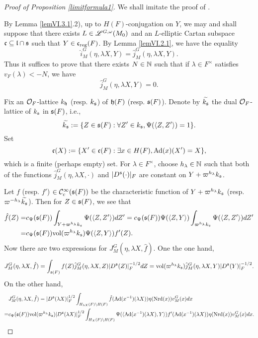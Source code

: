 \documentclass[a4paper]{amsart}
\newcommand{\vol}{{\mathrm{vol}}}                   \newcommand{\Vol}{{\mathrm{Vol}}}
\newcommand{\wt}{\widetilde}                        \newcommand{\wh}{\widehat}                      \newcommand{\wpair}[1]{\left\{{#1}\right\}}
\theoremstyle{definition}
\theoremstyle{remark}
\numberwithin{equation}{subsection}
\begin{document}
\begin{proof}[Proof of Proposition \ref{limitformula1}]
We shall imitate the proof of \cite[Proposition 2.2]{MR2164623}. 

By Lemma \ref{lemVI.3.1}.2), up to $H(F)$-conjugation on $Y$, we may and shall suppose that there exists $L\in\mathscr{L}^{G, \omega}(M_0)$ and an $L$-elliptic Cartan subspace ${\mathfrak{c}}\subseteq{\mathfrak{l}}\cap{\mathfrak{s}}$ such that $Y\in{\mathfrak{c}}_{\mathrm{reg}}(F)$. By Lemma \ref{lemVI.2.1}, we have the equality
$$ \hat{i}_M^G(\eta, \lambda X, Y)=\hat{j}_M^G(\eta, \lambda X, Y). $$
Thus it suffices to prove that there exists $N\in{\mathbb {N}}$ such that if $\lambda\in F^\times$ satisfies $v_F(\lambda)<-N$, we have
$$ \hat{j}_M^G(\eta, \lambda X, Y)=0. $$

Fix an ${\mathcal {O}}_F$-lattice $k_{\mathfrak{h}}$ (resp. $k_{\mathfrak{s}}$) of ${\mathfrak{h}}(F)$ (resp. ${\mathfrak{s}}(F)$). Denote by $\wt{k_\fs}$ the dual ${\mathcal {O}}_F$-lattice of $k_{\mathfrak{s}}$ in ${\mathfrak{s}}(F)$, i.e., 
$$ \wt{k_\fs}:=\{Z\in\fs(F): \forall Z'\in k_\fs, \Psi(\langle Z,Z'\rangle)=1\}. $$
Set
$$ {\mathfrak{c}}(X):=\{X'\in{\mathfrak{c}}(F): \exists x\in H(F), {\mathrm{Ad}}(x)(X')=X\}, $$
which is a finite (perhaps empty) set. For $\lambda\in F^\times$, choose $h_\lambda\in{\mathbb {N}}$ such that both of the functions $\hat{j}_M^G(\eta, \lambda X, \cdot)$ and $|D^{\mathfrak{s}}(\cdot)|_F$ are constant on $Y+\varpi^{h_\lambda} k_{\mathfrak{s}}$. 

Let $f$ (resp. $f'$) $\in{\mathcal {C}}_c^\infty({\mathfrak{s}}(F))$ be the characteristic function of $Y+\varpi^{h_\lambda}k_{\mathfrak{s}}$ (resp. $\varpi^{-h_\lambda}\wt{k_\fs}$). Then for $Z\in{\mathfrak{s}}(F)$, we see that
\[\begin{split}
\hat{f}(Z)=&c_\Psi(\fs(F))\int_{Y+\varpi^{h_\lambda}k_\fs} \Psi(\langle Z,Z' \rangle)dZ'=c_\Psi(\fs(F))\Psi(\langle Z,Y \rangle)\int_{\varpi^{h_\lambda}k_\fs} \Psi(\langle Z,Z' \rangle)dZ' \\
=&c_\Psi(\fs(F)) \vol(\varpi^{h_\lambda}k_\fs) \Psi(\langle Z,Y \rangle) f'(Z). 
\end{split}\]
Now there are two expressions for $J_M^G(\eta, \lambda X, \hat{f})$. One the one hand, 
\begin{equation}\label{prop2.2(2.5)exp1}
 J_M^G(\eta, \lambda X, \hat{f})=\int_{\fs(F)} f(Z) \hat{j}_M^G(\eta, \lambda X, Z) |D^\fs(Z)|_F^{-1/2} dZ=\vol(\varpi^{h_\lambda}k_\fs) \hat{j}_M^G(\eta, \lambda X, Y) |D^\fs(Y)|_F^{-1/2}. 
\end{equation}
On the other hand, 
\begin{equation}\label{prop2.2(2.6)exp2}
\begin{split}
 &J_M^G(\eta, \lambda X, \hat{f})=|D^\fs(\lambda X)|_F^{1/2} \int_{H_{\lambda X}(F)\bs H(F)} \hat{f}(\Ad(x^{-1})(\lambda X)) \eta(\Nrd(x)) v_M^G(x) dx \\
=&c_\Psi(\fs(F)) \vol(\varpi^{h_\lambda}k_\fs) |D^\fs(\lambda X)|_F^{1/2} \int_{H_X(F)\bs H(F)} \Psi(\langle \Ad(x^{-1})(\lambda X),Y \rangle) f'(\Ad(x^{-1})(\lambda X)) \eta(\Nrd(x)) v_M^G(x) dx. 
\end{split}
\end{equation}


\end{proof}
\end{document}
